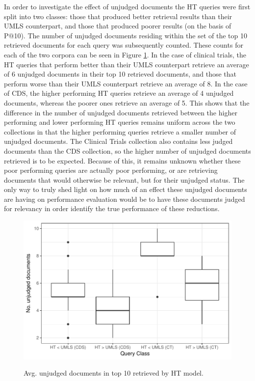 \documentclass[a4paper]{report}
\begin{document}
In order to investigate the effect of unjudged documents the HT queries were first split into two classes: those that produced better retrieval results than their UMLS counterpart, and those that produced poorer results (on the basis of P@10). The number of unjudged documents residing within the set of the top 10 retrieved documents for each query was subsequently counted. These counts for each of the two corpora can be seen in Figure \ref{unjudged-boxplot}. In the case of clinical trials, the HT queries that perform better than their UMLS counterpart retrieve an average of 6 unjudged documents in their top 10 retrieved documents, and those that perform worse than their UMLS counterpart retrieve an average of 8. In the case of CDS, the higher performing HT queries retrieve an average of 4 unjudged documents, whereas the poorer ones retrieve an average of 5. This shows that the difference in the number of unjudged documents retrieved between the higher performing and lower performing HT queries remains uniform across the two collections in that the higher performing queries retrieve a smaller number of unjudged documents. The Clinical Trials collection also contains less judged documents than the CDS collection, so the higher number of unjudged documents retrieved is to be expected. Because of this, it remains unknown whether these poor performing queries are actually poor performing, or are retrieving documents that would otherwise be relevant, but for their unjudged status. The only way to truly shed light on how much of an effect these unjudged documents are having on performance evaluation would be to have these documents judged for relevancy in order identify the true performance of these reductions.

\begin{figure}
\centering
\caption{Avg. unjudged documents in top 10 retrieved by HT model.}
\includegraphics[width=.9\columnwidth]{unjudged-boxplot.pdf}
\label{unjudged-boxplot}
\end{figure}
\end{document}

